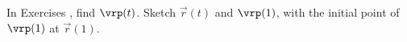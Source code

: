 {\noindent In Exercises}
{, find $\vrp (t)$. Sketch $\vec r(t)$ and $\vrp(1)$, with the initial point of $\vrp(1)$ at $\vec r(1)$.  
}
